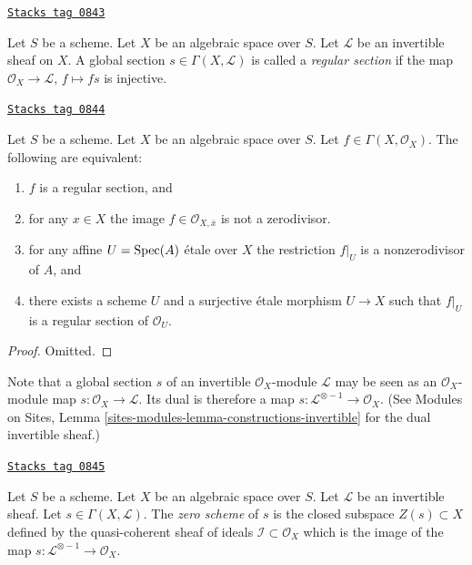 \begin{definition}
\label{spaces-divisors-definition-regular-section}
\href{https://stacks.math.columbia.edu/tag/0843}{\texttt{Stacks tag 0843}}

Let $S$ be a scheme. Let $X$ be an algebraic space over $S$.
Let $\mathcal{L}$ be an invertible sheaf on $X$.
A global section $s \in \Gamma(X, \mathcal{L})$ is called a
{\it regular section} if the map $\mathcal{O}_X \to \mathcal{L}$,
$f \mapsto fs$ is injective.
\end{definition}

\begin{lemma}
\label{spaces-divisors-lemma-regular-section-structure-sheaf}
\href{https://stacks.math.columbia.edu/tag/0844}{\texttt{Stacks tag 0844}}

Let $S$ be a scheme.
Let $X$ be an algebraic space over $S$.
Let $f \in \Gamma(X, \mathcal{O}_X)$.
The following are equivalent:
\begin{enumerate}
\item $f$ is a regular section, and
\item for any $x \in X$ the image $f \in \mathcal{O}_{X, \overline{x}}$
is not a zerodivisor.
\item for any affine $U = \operatorname{Spec}(A)$ \'etale over $X$
the restriction $f|_U$ is a nonzerodivisor of $A$, and
\item there exists a scheme $U$ and a surjective \'etale morphism
$U \to X$ such that $f|_U$ is a regular section of $\mathcal{O}_U$.
\end{enumerate}
\end{lemma}

\begin{proof}
Omitted.
\end{proof}

Note that a global section $s$ of an invertible $\mathcal{O}_X$-module
$\mathcal{L}$ may be seen as an $\mathcal{O}_X$-module map
$s : \mathcal{O}_X \to \mathcal{L}$. Its dual is therefore a
map $s : \mathcal{L}^{\otimes -1} \to \mathcal{O}_X$.
(See Modules on Sites, Lemma \ref{sites-modules-lemma-constructions-invertible}
for the dual invertible sheaf.)

\begin{definition}
\label{spaces-divisors-definition-zero-scheme-s}
\href{https://stacks.math.columbia.edu/tag/0845}{\texttt{Stacks tag 0845}}

Let $S$ be a scheme. Let $X$ be an algebraic space over $S$.
Let $\mathcal{L}$ be an invertible sheaf.
Let $s \in \Gamma(X, \mathcal{L})$.
The {\it zero scheme} of $s$ is the closed subspace $Z(s) \subset X$
defined by the quasi-coherent sheaf of ideals
$\mathcal{I} \subset \mathcal{O}_X$ which is the image of the
map $s : \mathcal{L}^{\otimes -1} \to \mathcal{O}_X$.
\end{definition}

